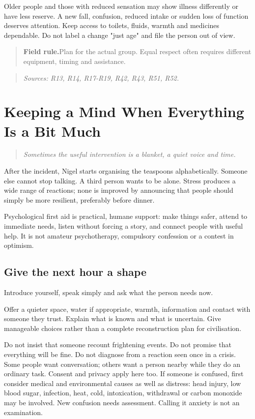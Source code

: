 \documentclass[10pt,openright]{book}
\newcommand{\fieldrule}[1]{\begin{quote}\textbf{Field rule.}\enspace #1\end{quote}}
\begin{document}
Older people and those with reduced sensation may show illness differently or have less reserve. A new fall, confusion, reduced intake or sudden loss of function deserves attention. Keep access to toilets, fluids, warmth and medicines dependable. Do not label a change "just age" and file the person out of view.

\fieldrule{Plan for the actual group. Equal respect often requires different equipment, timing and assistance.}
\begin{quote}\emph{Sources: R13, R14, R17-R19, R42, R43, R51, R52.}\end{quote}
\chapter{Keeping a Mind When Everything Is a Bit Much}
\begin{quote}\emph{Sometimes the useful intervention is a blanket, a quiet voice and time.}\end{quote}
After the incident, Nigel starts organising the teaspoons alphabetically. Someone else cannot stop talking. A third person wants to be alone. Stress produces a wide range of reactions; none is improved by announcing that people should simply be more resilient, preferably before dinner.

Psychological first aid is practical, humane support: make things safer, attend to immediate needs, listen without forcing a story, and connect people with useful help. It is not amateur psychotherapy, compulsory confession or a contest in optimism.

\section*{Give the next hour a shape}
Introduce yourself, speak simply and ask what the person needs now.

Offer a quieter space, water if appropriate, warmth, information and contact with someone they trust. Explain what is known and what is uncertain. Give manageable choices rather than a complete reconstruction plan for civilisation.

Do not insist that someone recount frightening events. Do not promise that everything will be fine. Do not diagnose from a reaction seen once in a crisis. Some people want conversation; others want a person nearby while they do an ordinary task. Consent and privacy apply here too. If someone is confused, first consider medical and environmental causes as well as distress: head injury, low blood sugar, infection, heat, cold, intoxication, withdrawal or carbon monoxide may be involved. New confusion needs assessment. Calling it anxiety is not an examination.
\end{document}
